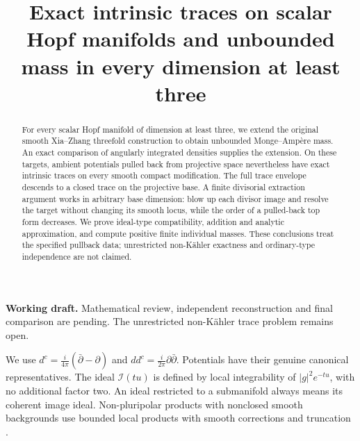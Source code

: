 \documentclass[11pt]{article}
\title{Exact intrinsic traces on scalar Hopf manifolds\newline
and unbounded mass in every dimension at least three}
\author{}
\date{}
\newcommand{\ddc}{dd^c}
\newcommand{\I}{\mathcal I}
\theoremstyle{remark}\newtheorem{remark}[theorem]{Remark}
\begin{document}
\maketitle
\noindent\textbf{Working draft.} Mathematical review, independent
reconstruction and final comparison are pending. The unrestricted
non-K\"ahler trace problem remains open.
\begin{abstract}
For every scalar Hopf manifold of dimension at least three, we extend
the original smooth Xia--Zhang threefold construction to obtain
unbounded Monge--Amp\`ere mass. An exact comparison of angularly
integrated densities supplies the extension. On these targets, ambient
potentials pulled back from projective space nevertheless have exact
intrinsic traces on every smooth compact modification. The full trace
envelope descends to a closed trace on the projective base. A finite
divisorial extraction argument works in arbitrary base dimension:
blow up each divisor image and resolve the target without changing its
smooth locus, while the order of a pulled-back top form decreases.
We prove ideal-type compatibility, addition and analytic approximation,
and compute positive finite individual masses. These conclusions treat
the specified pullback data; unrestricted non-K\"ahler exactness and
ordinary-type independence are not claimed.
\end{abstract}

We use $d^c=\frac{i}{4\pi}(\bar\partial-\partial)$ and
$\ddc=\frac{i}{2\pi}\partial\bar\partial$.
Potentials have their genuine canonical representatives.
The ideal $\I(tu)$ is defined by local integrability of
$|g|^2e^{-tu}$, with no additional factor two.
An ideal restricted to a submanifold always means its coherent image
ideal. Non-pluripolar products with nonclosed smooth backgrounds use
bounded local products with smooth corrections and truncation
\cite[Section 2.1]{BGL}.
\end{document}
